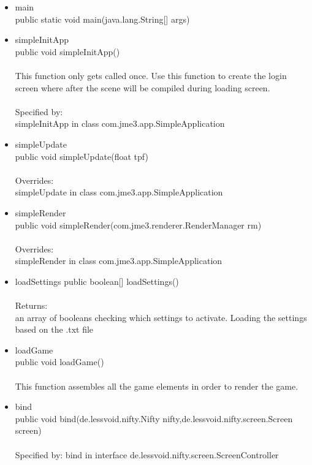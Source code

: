 \documentclass[letterpaper]{article}
\begin{document}
\begin{itemize}
							\begin{itemize}
								\item	main \\
										public static void main(java.lang.String[] args)
								\item	simpleInitApp \\
										public void simpleInitApp() \\ \\
										This function only gets called once. Use this function to create the login screen where after the scene will be compiled during loading screen. \\ \\
										Specified by: \\
										simpleInitApp in class com.jme3.app.SimpleApplication
								\item	simpleUpdate \\
										public void simpleUpdate(float tpf) \\ \\
										Overrides: \\
										simpleUpdate in class com.jme3.app.SimpleApplication
								\item	simpleRender \\
										public void simpleRender(com.jme3.renderer.RenderManager rm) \\ \\
										Overrides: \\
										simpleRender in class com.jme3.app.SimpleApplication
								\item	loadSettings
										public boolean[] loadSettings() \\ \\
										Returns: \\
										an array of booleans checking which settings to activate. Loading the settings based on the .txt file
								\item	loadGame \\
										public void loadGame() \\ \\
										This function assembles all the game elements in order to render the game.
								\item	bind \\
										public void bind(de.lessvoid.nifty.Nifty nifty,de.lessvoid.nifty.screen.Screen screen) \\ \\
										Specified by:
										bind in interface de.lessvoid.nifty.screen.ScreenController \\ \\

\end{itemize}
\end{itemize}
\end{document}
